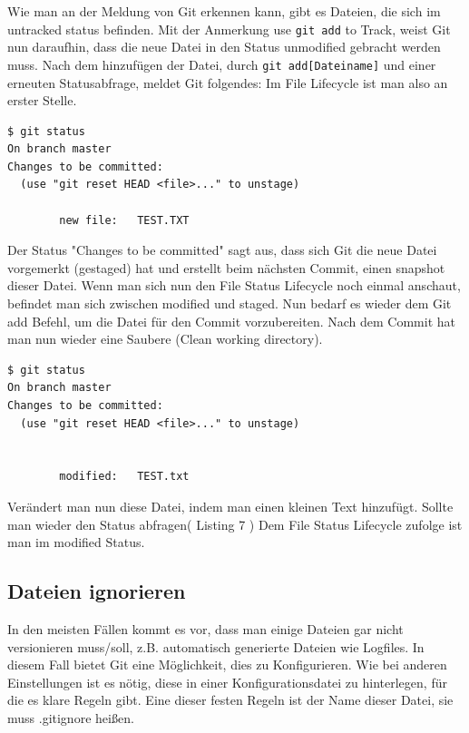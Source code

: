 \documentclass[12pt,a4paper,bibliography=totocnumbered,listof=totocnumbered]{scrartcl}
\begin{document}
Wie man an der Meldung von Git erkennen kann, gibt es Dateien, die sich im untracked status befinden. Mit der Anmerkung use \lstinline|git add| to Track, weist Git nun daraufhin, dass die neue Datei in den Status unmodified gebracht werden muss. Nach dem hinzufügen der Datei, durch \lstinline|git add[Dateiname]| und einer erneuten Statusabfrage, meldet Git folgendes:
Im File Lifecycle ist man also an erster Stelle.
\newpage
\vspace{1em}
\begin{lstlisting}[caption=Git Statusbefehl nachdem erzeugen einer Datei, label=lst:arduino]
$ git status
On branch master
Changes to be committed:
  (use "git reset HEAD <file>..." to unstage)

        new file:   TEST.TXT

\end{lstlisting}
Der Status "Changes to be committed" sagt aus, dass sich Git die neue Datei vorgemerkt (gestaged) hat und erstellt beim nächsten Commit, einen snapshot dieser Datei. Wenn man sich nun den File Status Lifecycle noch einmal anschaut, befindet man sich zwischen modified und staged. Nun bedarf es wieder dem Git add Befehl, um die Datei für den Commit vorzubereiten. Nach dem Commit hat man nun wieder eine Saubere (Clean working directory). 

\vspace{1em}
\begin{lstlisting}[caption=Git Statusbefehl nachdem verändern einer Datei, label=lst:arduino]
$ git status
On branch master
Changes to be committed:
  (use "git reset HEAD <file>..." to unstage)

      
        modified:   TEST.txt

\end{lstlisting}
Verändert man nun diese Datei, indem man einen kleinen Text hinzufügt. Sollte man wieder den Status abfragen( Listing 7 )
Dem File Status Lifecycle zufolge ist man im modified Status. 

\subsection{Dateien ignorieren}
In den meisten Fällen kommt es vor, dass man einige Dateien gar nicht versionieren muss/soll, z.B. automatisch generierte Dateien wie Logfiles. In diesem Fall bietet Git eine Möglichkeit, dies zu Konfigurieren. Wie bei anderen Einstellungen ist es nötig, diese in einer Konfigurationsdatei zu hinterlegen, für die es klare Regeln gibt. Eine dieser festen Regeln ist der Name dieser Datei, sie muss .gitignore heißen.
\end{document}
